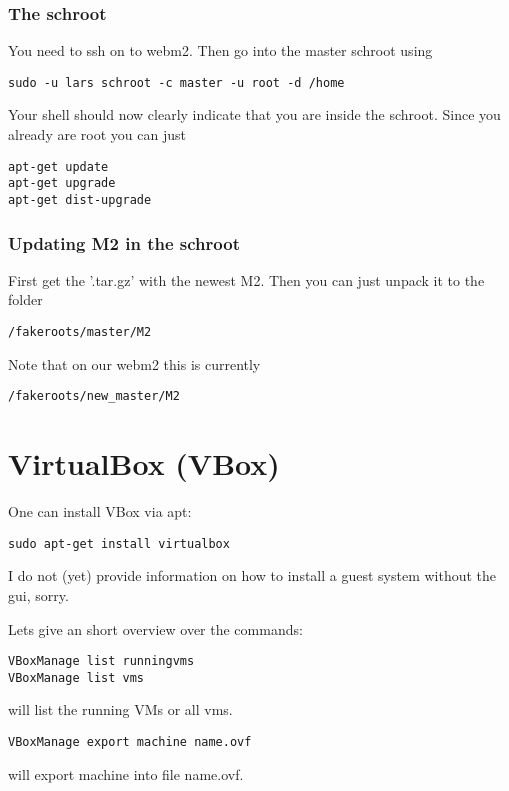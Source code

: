\documentclass[a4paper]{book}
\begin{document}
\subsection{The schroot}
You need to ssh on to webm2. Then go into the master schroot using
\begin{verbatim}
sudo -u lars schroot -c master -u root -d /home
\end{verbatim}
Your shell should now clearly indicate that you are inside the schroot. Since you already are root you can just
\begin{verbatim}
apt-get update
apt-get upgrade
apt-get dist-upgrade
\end{verbatim}
\subsection{Updating M2 in the schroot}
First get the '.tar.gz' with the newest M2. Then you can just unpack it to the folder
\begin{verbatim}
/fakeroots/master/M2
\end{verbatim}
Note that on our webm2 this is currently
\begin{verbatim}
/fakeroots/new_master/M2
\end{verbatim}


\chapter{VirtualBox (VBox)}
One can install VBox via apt:
\begin{verbatim}
sudo apt-get install virtualbox
\end{verbatim}
I do not (yet) provide information on how to install a guest system without the gui, sorry.

Lets give an short overview over the commands:

\begin{verbatim}
VBoxManage list runningvms
VBoxManage list vms
\end{verbatim}
will list the running VMs or all vms.

\begin{verbatim}
VBoxManage export machine name.ovf
\end{verbatim}
will export machine into file name.ovf.
\end{document}
